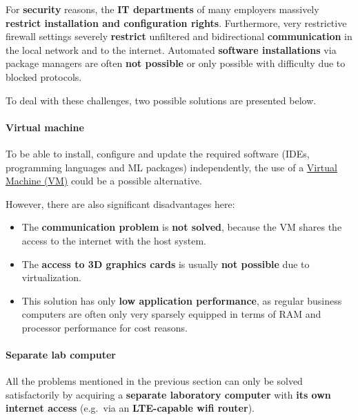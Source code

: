 \documentclass [oneside,10pt,a4paper,ngerman,BCOR10mm,headsepline,parindent,final]{scrartcl}
\providecommand{\tightlist}{%
      \setlength{\itemsep}{0pt}\setlength{\parskip}{0pt}}
\begin{document}
For \textbf{security} reasons, the \textbf{IT departments} of many
employers massively \textbf{restrict installation and configuration
rights}. Furthermore, very restrictive firewall settings severely
\textbf{restrict} unfiltered and bidirectional \textbf{communication} in
the local network and to the internet. Automated \textbf{software
installations} via package managers are often \textbf{not possible} or
only possible with difficulty due to blocked protocols.

To deal with these challenges, two possible solutions are presented
below.

    \hypertarget{virtual-machine}{%
\paragraph{Virtual machine}\label{virtual-machine}}

To be able to install, configure and update the required software (IDEs,
programming languages and ML packages) independently, the use of a
\href{https://en.wikipedia.org/wiki/Virtual_machine}{Virtual Machine
(VM)} could be a possible alternative.

However, there are also significant disadvantages here:

\begin{itemize}
\tightlist
\item
  The \textbf{communication problem} is \textbf{not solved}, because the
  VM shares the access to the internet with the host system.
\item
  The \textbf{access to 3D graphics cards} is usually \textbf{not
  possible} due to virtualization.
\item
  This solution has only \textbf{low application performance}, as
  regular business computers are often only very sparsely equipped in
  terms of RAM and processor performance for cost reasons.
\end{itemize}

    \hypertarget{separate-lab-computer}{%
\paragraph{Separate lab computer}\label{separate-lab-computer}}

All the problems mentioned in the previous section can only be solved
satisfactorily by acquiring a \textbf{separate laboratory computer} with
\textbf{its own internet access} (e.g.~via an \textbf{LTE-capable wifi
router}).
\end{document}
